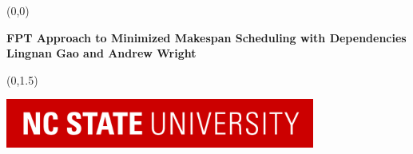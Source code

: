 \documentclass[a0]{a0poster}
\begin{document}
\newcommand{\defproblem}[4]{%
  \hfill\\\smallskip\noindent%
  \begin{tabularx}{.45 \textwidth}{|l X|}%
    \hline%
    \multicolumn{2}{|l|}{{#1}}\\%
    \textbf{Input:}&#2\\%
    \textbf{Parameter:}&#3\\%
    \textbf{Question:}&#4\smallskip\\\hline%
  \end{tabularx}%
  \smallskip%
}%



\parindent=0pt
\baselineskip



%
%



\begin{textblock}{24}(0,0)
\begin{center}
\vspace{-0.25in}
\huge{\textbf{FPT Approach to Minimized Makespan Scheduling with Dependencies}}\\
\vspace{0.35in}
\large{\textbf{Lingnan Gao and Andrew Wright}}
 \end{center}
\end{textblock}

 \begin{textblock}{6}(0,1.5)
 \begin{center}
 \includegraphics[width=4in]{images/ncsu.png}
 \end{center}
 \end{textblock}
\end{document}
